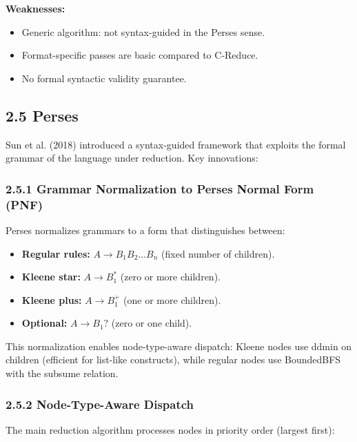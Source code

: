 \documentclass[
  letterpaper,
]{article}
\providecommand{\tightlist}{%
  \setlength{\itemsep}{0pt}\setlength{\parskip}{0pt}}
\begin{document}
\textbf{Weaknesses:}

\begin{itemize}
\tightlist
\item
  Generic algorithm: not syntax-guided in the Perses sense.
\item
  Format-specific passes are basic compared to C-Reduce.
\item
  No formal syntactic validity guarantee.
\end{itemize}

\subsection{2.5 Perses}\label{perses}

Sun et al. (2018) introduced a syntax-guided framework that exploits the
formal grammar of the language under reduction. Key innovations:

\subsubsection{2.5.1 Grammar Normalization to Perses Normal Form
(PNF)}\label{grammar-normalization-to-perses-normal-form-pnf}

Perses normalizes grammars to a form that distinguishes between:

\begin{itemize}
\tightlist
\item
  \textbf{Regular rules:} \(A \to B_1 B_2 \ldots B_n\) (fixed number of
  children).
\item
  \textbf{Kleene star:} \(A \to B_1^*\) (zero or more children).
\item
  \textbf{Kleene plus:} \(A \to B_1^+\) (one or more children).
\item
  \textbf{Optional:} \(A \to B_1?\) (zero or one child).
\end{itemize}

This normalization enables node-type-aware dispatch: Kleene nodes use
ddmin on children (efficient for list-like constructs), while regular
nodes use BoundedBFS with the subsume relation.

\subsubsection{2.5.2 Node-Type-Aware
Dispatch}\label{node-type-aware-dispatch}

The main reduction algorithm processes nodes in priority order (largest
first):
\end{document}

